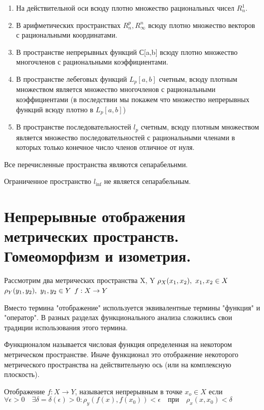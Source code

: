 \documentclass[12pt]{report}
\renewcommand{\[}{$\\\displaystyle}
\renewcommand{\]}{\\$}
\renewcommand{\[}{$\\\displaystyle}
\newcommand{\sep}{,\ }
\begin{document}
\begin{enumerate}
  \item На действительной оси всюду плотно множество рациональных чисел $R_n^1$.

  \item В арифметических пространствах $R_n^p, R_\infty^n$ всюду плотно
  множество векторов с рациональными координатами.

  \item В пространстве непрерывных функций С[a,b] всюду плотно множество
  многочленов с рациональными коэффициентами.

  \item В пространстве лебеговых функций $L_p[a,b]$ счетным, всюду плотным
  множеством является множество многочленов с рациональными коэффициентами (в
  последствии мы покажем что множество непрерывных функций всюду плотно в
  $L_p[a,b]$)

  \item В пространстве последовательностей $l_p$ счетным, всюду плотным
  множеством является множество последовательностей с рациональными членами в
  которых только конечное число членов отличное от нуля.
\end{enumerate}

Все перечисленные пространства являются сепарабельнми.

Ограниченное пространство $l_{\inf}$ не является сепарабельным.

\section{Непрерывные отображения метрических пространств.
Гомеоморфизм и изометрия.}

Рассмотрим два метрических пространства X, Y
\[\rho_X(x_1,x_2)\sep x_1,x_2\in X \]
\[\rho_Y(y_1, y_2)\sep y_1,y_2\in Y \]
\[ f: X \rightarrow Y\]

Вместо термина "отображение" используется эквивалентные термины "функция" и
"оператор". В разных разделах функционального анализа сложились свои традиции
использования этого термина.

Функционалом называется числовая функция определенная на некотором метрическом
пространстве. Иначе функционал это отображение некоторого метрического
пространства на действительную ось (или на комплексную плоскость).

Отображение $f: X\rightarrow Y$, называется непрерывным в точке $x_o\in X$ если
$ \forall \epsilon > 0 \quad \exists \delta = \delta (\epsilon) > 0:
\rho_y(f(x), f(x_0)) < \epsilon \quad \text{при} \quad \rho_x(x,x_0)<\delta $
\end{document}
